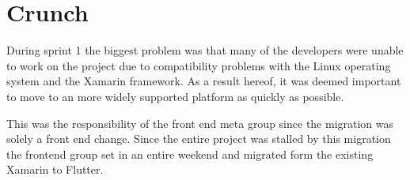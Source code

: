 \section{Crunch}
During sprint 1 the biggest problem was that many of the developers were unable to work on the project due to compatibility problems with the Linux operating system and the Xamarin framework. 
As a result hereof, it was deemed important to move to an more widely supported platform as quickly as possible. 

This was the responsibility of the front end meta group since the migration was solely a front end change. 
Since the entire project was stalled by this migration the frontend group set in an entire weekend and migrated form the existing Xamarin to Flutter.
